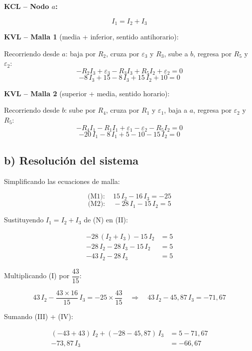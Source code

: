 \documentclass[12pt,letterpaper]{article}
\begin{document}
\begin{minipage}[t]{0.58\textwidth}
\vspace{6pt}

\textbf{KCL -- Nodo $a$:}

\[
    \boxed{I_1 = I_2 + I_3} \tag{N}
\]

\medskip
\textbf{KVL -- Malla 1} (media + inferior, sentido antihorario):

Recorriendo desde $a$: baja por $R_2$, cruza por $\varepsilon_3$ y $R_3$, sube a $b$,
regresa por $R_5$ y $\varepsilon_2$:
\[
    -R_2 I_3 + \varepsilon_3 - R_3 I_3 + R_5 I_2 + \varepsilon_2 = 0
\]
\[
    \boxed{-8\,I_3 + 15 - 8\,I_3 + 15\,I_2 + 10 = 0} \tag{M1}
\]

\medskip
\textbf{KVL -- Malla 2} (superior + media, sentido horario):

Recorriendo desde $b$: sube por $R_4$, cruza por $R_1$ y $\varepsilon_1$,
baja a $a$, regresa por $\varepsilon_2$ y $R_5$:
\[
    -R_4 I_1 - R_1 I_1 + \varepsilon_1 - \varepsilon_2 - R_5 I_2 = 0
\]
\[
    \boxed{-20\,I_1 - 8\,I_1 + 5 - 10 - 15\,I_2 = 0} \tag{M2}
\]
\end{minipage}

\newpage

\subsection*{b) Resoluci\'on del sistema}

Simplificando las ecuaciones de malla:

\[
    \text{(M1)}: \quad 15\,I_2 - 16\,I_3 = -25 \tag{I}
\]
\[
    \text{(M2)}: \quad -28\,I_1 - 15\,I_2 = 5 \tag{II}
\]

Sustituyendo $I_1 = I_2 + I_3$ de (N) en (II):

\begin{align*}
    -28\,(I_2 + I_3) - 15\,I_2 &= 5 \\
    -28\,I_2 - 28\,I_3 - 15\,I_2 &= 5 \\
    -43\,I_2 - 28\,I_3 &= 5 \tag{III}
\end{align*}

Multiplicando (I) por $\dfrac{43}{15}$:

\[
    43\,I_2 - \frac{43 \times 16}{15}\,I_3 = -25 \times \frac{43}{15}
    \quad\Rightarrow\quad
    43\,I_2 - 45{,}87\,I_3 = -71{,}67 \tag{IV}
\]

Sumando (III) + (IV):

\begin{align*}
    (-43 + 43)\,I_2 + (-28 - 45{,}87)\,I_3 &= 5 - 71{,}67 \\
    -73{,}87\,I_3 &= -66{,}67
\end{align*}
\end{document}
